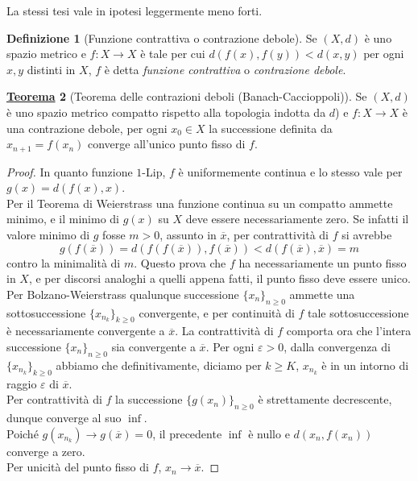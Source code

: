 \documentclass[a4paper,twoside]{article}
\renewcommand{\epsilon}{\varepsilon}
\theoremstyle{definition}
\newtheorem{theorem}{\color{Red}\underline{\textrm Teorema}}
\newtheorem{definizione}[theorem]{Definizione}
\numberwithin{theorem}{section}
\begin{document}
La stessi tesi vale in ipotesi leggermente meno forti.

\begin{definizione}[Funzione contrattiva o contrazione debole] Se $(X,d)$ è uno spazio metrico e $f:X\to X$ è tale per cui  $d(f(x),f(y))<d(x,y)$ per ogni $x,y$ distinti in $X$, $f$ è detta \emph{funzione contrattiva} o \emph{contrazione debole}. 
\end{definizione}

\begin{theorem}[Teorema delle contrazioni deboli (Banach-Caccioppoli)] Se $(X,d)$ è uno spazio metrico compatto rispetto alla topologia indotta da $d$) e $f:X\to X$ è una contrazione debole, per ogni $x_0\in X$ la successione definita da $x_{n+1}=f(x_n)$ converge all'unico punto fisso di $f$. 
\end{theorem}

\begin{proof}
In quanto funzione $1$-Lip, $f$ è uniformemente continua e lo stesso vale per $g(x)=d(f(x),x)$.\\ Per il Teorema di Weierstrass una funzione continua su un compatto ammette minimo, e il minimo di $g(x)$ su $X$ deve essere necessariamente zero. Se infatti il valore minimo di $g$ fosse $m>0$, assunto in $\overline{x}$, per contrattività di $f$ si avrebbe 
$$ g(f(\overline{x})) = d(f(f(\overline{x})),f(\overline{x})) < d(f(\overline{x}),\overline{x}) = m $$
contro la minimalità di $m$. Questo prova che $f$ ha necessariamente un punto fisso in $X$, e per discorsi analoghi a quelli appena fatti, il punto fisso deve essere unico. Per Bolzano-Weierstrass qualunque successione $\{x_n\}_{n\geq 0}$ ammette una sottosuccessione $\{x_{n_k}\}_{k\geq 0}$ convergente, e per continuità di $f$ tale sottosuccessione è necessariamente convergente a $\overline{x}$. La contrattività di $f$ comporta ora che l'intera successione $\{x_n\}_{n\geq 0}$ sia convergente a $\overline{x}$. Per ogni $\epsilon > 0$,  dalla convergenza di $\{x_{n_k}\}_{k\geq 0}$ abbiamo che definitivamente, diciamo per $k\geq K$, $x_{n_k}$ è in un intorno di raggio $\epsilon$ di $\overline{x}$.\\ 
Per contrattività di $f$ la successione $\{g(x_n)\}_{n\geq 0}$ è strettamente decrescente, dunque converge al suo $\inf$.\\ Poiché $g(x_{n_k})\to g(\overline{x}) = 0$, il precedente $\inf$ è nullo e $d(x_n,f(x_n))$ converge a zero.\\ Per unicità del punto fisso di $f$, $x_n\to\overline{x}$.\end{proof}
\end{document}
